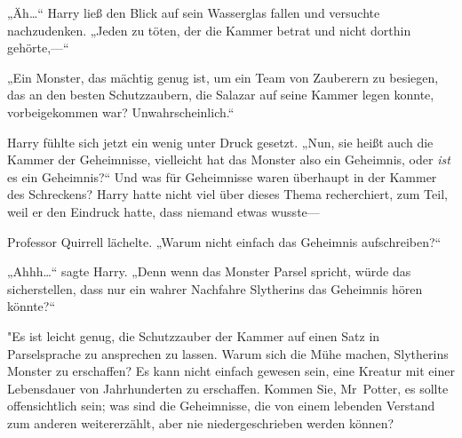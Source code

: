 „Äh…“ Harry ließ den Blick auf sein Wasserglas fallen und versuchte nachzudenken. „Jeden zu töten, der die Kammer betrat und nicht dorthin gehörte,—“

„Ein Monster, das mächtig genug ist, um ein Team von Zauberern zu besiegen, das an den besten Schutzzaubern, die Salazar auf seine Kammer legen konnte, vorbeigekommen war? Unwahrscheinlich.“

Harry fühlte sich jetzt ein wenig unter Druck gesetzt. „Nun, sie heißt auch die Kammer der Geheimnisse, vielleicht hat das Monster also ein Geheimnis, oder \emph{ist} es ein Geheimnis?“ Und was für Geheimnisse waren überhaupt in der Kammer des Schreckens? Harry hatte nicht viel über dieses Thema recherchiert, zum Teil, weil er den Eindruck hatte, dass niemand etwas wusste—

Professor Quirrell lächelte. „Warum nicht einfach das Geheimnis aufschreiben?“

„Ahhh…“ sagte Harry. „Denn wenn das Monster Parsel spricht, würde das sicherstellen, dass nur ein wahrer Nachfahre Slytherins das Geheimnis hören könnte?“

"Es ist leicht genug, die Schutzzauber der Kammer auf einen Satz in Parselsprache zu ansprechen zu lassen. Warum sich die Mühe machen, Slytherins Monster zu erschaffen? Es kann nicht einfach gewesen sein, eine Kreatur mit einer Lebensdauer von Jahrhunderten zu erschaffen. Kommen Sie, Mr~Potter, es sollte offensichtlich sein; was sind die Geheimnisse, die von einem lebenden Verstand zum anderen weitererzählt, aber nie niedergeschrieben werden können?

